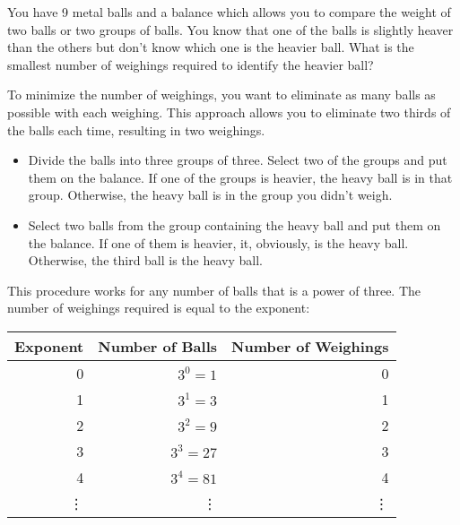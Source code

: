 \documentclass[letterpaper]{exam}
\begin{document}
    \begin{questions}
  
        \question{}
          You have 9 metal balls and a balance which allows you to compare the weight of two balls or
          two groups of balls.  You know that one of the balls is slightly heaver than the others but
          don't know which one is the heavier ball.  What is the smallest number of weighings required
          to identify the heavier ball?
  
          \begin{solution}
              To minimize the number of weighings, you want to eliminate as many balls as possible with each
              weighing.  This approach allows you to eliminate two thirds of the balls each time, resulting
              in two weighings.
    
              \begin{itemize}
                \item 
                  Divide the balls into three groups of three.  Select two of the groups and put them on
                  the balance.  If one of the groups is heavier, the heavy ball is in that group.
                  Otherwise, the heavy ball is in the group you didn't weigh.
    
                \item 
                  Select two balls from the group containing the heavy ball and put them on the balance.
                  If one of them is heavier, it, obviously, is the heavy ball.  Otherwise, the third ball
                  is the heavy ball. 
    
              \end{itemize}
    
              This procedure works for any number of balls that is a power of three. The number of
              weighings required is equal to the exponent:
    
              \begin{tabular}{rrr}
                  \toprule
                  Exponent & Number of Balls & Number of Weighings \\
                  \midrule
                  0        & $3^0 = 1$       & 0 \\
                  1        & $3^1 = 3$       & 1 \\
                  2        & $3^2 = 9$       & 2 \\
                  3        & $3^3 = 27$      & 3 \\
                  4        & $3^4 = 81$      & 4 \\
                  \vdots   & \vdots          & \vdots \\
                  \bottomrule
              \end{tabular}
    

\end{solution}
\end{questions}
\end{document}
